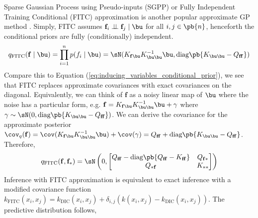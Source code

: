 \documentclass[11pt]{article}
\renewcommand\bf{\ensuremath{\mathbf{f}}}
\begin{document}
Sparse Gaussian Process using Pseudo-inputs (SGPP) or Fully Independent Training Conditional (FITC) approximation is another popular approximate GP method \cite{snelsonSparseGaussianProcesses2005}. Simply, FITC assumes $\bf_i\dperp \bf_j \mid \bu$ for all $i,j\in\pb{n}$, henceforth the conditional priors are fully (conditionally) independent. 
\begin{align}
    q_{\text{FITC}}(\bf\mid\bu)
        = \prod_{i=1}^n p(f_i\mid \bu)
        = \sN( K_{\bf\bu}K_{\bu\bu}^{-1} \bu, \text{diag}\pb{ K_{\bu\bu} - Q_{\bf\bf} } )
\end{align}
Compare this to Equation (\ref{eq:inducing_variables_conditional_prior}), we see that FITC replaces approximate covariances with exact covariances on the diagonal. Equivalently, we can think of $\bf$ as a noisy linear map of $\bu$ where the noise has a particular form, e.g. $\bf = K_{\bf\bu}K_{\bu\bu}^{-1} \bu + \gamma$ where $\gamma \sim \sN(0, \text{diag}\pb{ K_{\bu\bu} - Q_{\bf\bf} })$. We can derive the covariance for the approximate posterior $\cov_q(\bf) = \cov( K_{\bf\bu}K_{\bu\bu}^{-1} \bu ) + \cov( \gamma ) = Q_{\bf\bf} + \text{diag}\pb{  K_{\bu\bu} - Q_{\bf\bf} }$. Therefore,
\begin{align}
    q_{\text{FITC}}(\bf,\bf_*)
        = \sN\left(
            0,
            \begin{bmatrix}
                Q_{\bf\bf} - \text{diag}\pb{Q_{\bf\bf} - K_{\bf\bf}} & Q_{\bf*} \\ 
                Q_{*\bf} & K_{**} \\
            \end{bmatrix}
        \right)
\end{align}
Inference with FITC approximation is equivalent to exact inference with a modified covariance function $k_{\text{FITC}}(x_i,x_j) = k_{\text{DIC}}(x_i,x_j) + \delta_{i,j} (k(x_i,x_j) - k_{\text{DIC}}(x_i,x_j))$. The predictive distribution follows,
\end{document}
